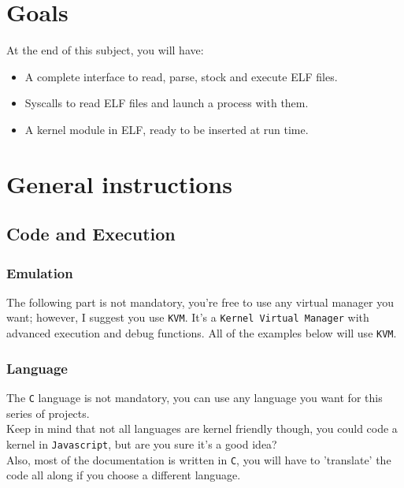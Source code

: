 \documentclass{42-en}
\begin{document}
\chapter{Goals}
    At the end of this subject, you will have:
    \begin{itemize}\itemsep1pt
        \item A complete interface to read, parse, stock and execute ELF files.
        \item Syscalls to read ELF files and launch a process with them.
        \item A kernel module in ELF, ready to be inserted at run time.
    \end{itemize}

\chapter{General instructions}
    \section{Code and Execution}
        \subsection{Emulation}
        The following part is not mandatory, you're free to use any virtual
        manager you want; however, I suggest you use \texttt{KVM}.
        It's a \texttt{Kernel Virtual Manager} with advanced execution
        and debug functions.
        All of the examples below will use \texttt{KVM}.
        \subsection{Language}
            The \texttt{C} language is not mandatory, you can use any language
            you want for this series of projects.\\
            Keep in mind that not all languages are kernel friendly though, you
            could code a kernel in \texttt{Javascript}, but are you sure it's a
            good idea?\\
            Also, most of the documentation is written in \texttt{C}, you will
            have to 'translate' the code all along if you choose a different
            language.\\
\end{document}
